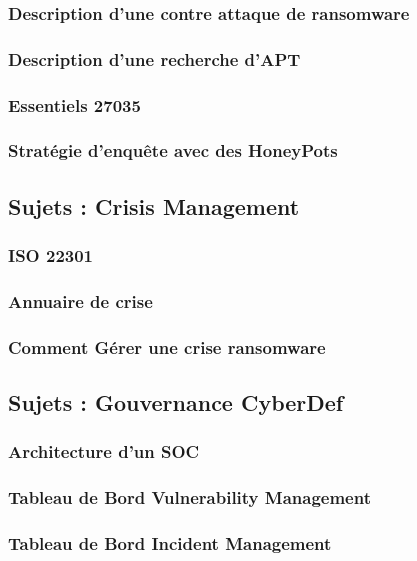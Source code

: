 \subsubsection{Description d'une  contre attaque de ransomware} 
\subsubsection{Description d'une recherche d'APT}
\subsubsection{Essentiels 27035}

\subsubsection{Stratégie d'enquête avec des HoneyPots}

\subsection{Sujets : Crisis Management}
\subsubsection{ISO 22301}
\subsubsection{Annuaire de crise}
\subsubsection{Comment Gérer une crise ransomware }


\subsection{Sujets : Gouvernance CyberDef}
\subsubsection{Architecture d'un SOC}
\subsubsection{Tableau de Bord Vulnerability Management}
\subsubsection{Tableau de Bord Incident Management}

